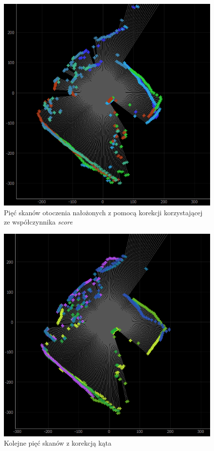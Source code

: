 \begin{figure}[ht]
	\centering
		\includegraphics[width=0.8\linewidth]{rys/ScanBot-14-angular-alignment.PNG}
	\caption{Pięć skanów otoczenia nałożonych z pomocą korekcji korzystającej ze współczynnika \emph{score}}
	\label{fig:score-alignment-eval-1}
\end{figure}

\begin{figure}[ht]
	\centering
		\includegraphics[width=0.8\linewidth]{rys/ScanBot-15-angular-alignment.PNG}
	\caption{Kolejne pięć skanów z korekcją kąta}
	\label{fig:score-alignment-eval-2}
\end{figure}



